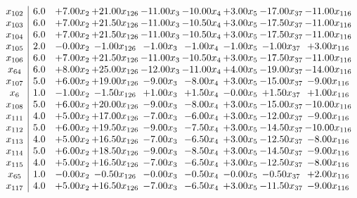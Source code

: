 \documentclass[8pt]{article}
\begin{document}
\[\begin{array}{c| c c@{\hskip 2pt} c@{\hskip 2pt} c@{\hskip 2pt} c@{\hskip 2pt} c@{\hskip 2pt} c@{\hskip 2pt} c@{\hskip 2pt} }
 x_{102}   &  6.0 & +  7.00 x_{2} & + 21.00 x_{126} & -11.00 x_{3} & -10.00 x_{4} & +  3.00 x_{5} & -17.00 x_{37} & -11.00 x_{116}\\
 x_{103}   &  6.0 & +  7.00 x_{2} & + 21.50 x_{126} & -11.00 x_{3} & -10.50 x_{4} & +  3.00 x_{5} & -17.50 x_{37} & -11.00 x_{116}\\
 x_{104}   &  6.0 & +  7.00 x_{2} & + 21.50 x_{126} & -11.00 x_{3} & -10.50 x_{4} & +  3.00 x_{5} & -17.50 x_{37} & -11.00 x_{116}\\
 x_{105}   &  2.0 & -0.00 x_{2} & -1.00 x_{126} & -1.00 x_{3} & -1.00 x_{4} & -1.00 x_{5} & -1.00 x_{37} & +  3.00 x_{116}\\
 x_{106}   &  6.0 & +  7.00 x_{2} & + 21.50 x_{126} & -11.00 x_{3} & -10.50 x_{4} & +  3.00 x_{5} & -17.50 x_{37} & -11.00 x_{116}\\
 x_{64}   &  6.0 & +  8.00 x_{2} & + 25.00 x_{126} & -12.00 x_{3} & -11.00 x_{4} & +  4.00 x_{5} & -19.00 x_{37} & -14.00 x_{116}\\
 x_{107}   &  5.0 & +  6.00 x_{2} & + 19.00 x_{126} & -9.00 x_{3} & -8.00 x_{4} & +  3.00 x_{5} & -15.00 x_{37} & -9.00 x_{116}\\
 x_{6}   &  1.0 & -1.00 x_{2} & -1.50 x_{126} & +  1.00 x_{3} & +  1.50 x_{4} & -0.00 x_{5} & +  1.50 x_{37} & +  1.00 x_{116}\\
 x_{108}   &  5.0 & +  6.00 x_{2} & + 20.00 x_{126} & -9.00 x_{3} & -8.00 x_{4} & +  3.00 x_{5} & -15.00 x_{37} & -10.00 x_{116}\\
 x_{111}   &  4.0 & +  5.00 x_{2} & + 17.00 x_{126} & -7.00 x_{3} & -6.00 x_{4} & +  3.00 x_{5} & -12.00 x_{37} & -9.00 x_{116}\\
 x_{112}   &  5.0 & +  6.00 x_{2} & + 19.50 x_{126} & -9.00 x_{3} & -7.50 x_{4} & +  3.00 x_{5} & -14.50 x_{37} & -10.00 x_{116}\\
 x_{113}   &  4.0 & +  5.00 x_{2} & + 16.50 x_{126} & -7.00 x_{3} & -6.50 x_{4} & +  3.00 x_{5} & -12.50 x_{37} & -8.00 x_{116}\\
 x_{114}   &  5.0 & +  6.00 x_{2} & + 18.50 x_{126} & -9.00 x_{3} & -8.50 x_{4} & +  3.00 x_{5} & -14.50 x_{37} & -9.00 x_{116}\\
 x_{115}   &  4.0 & +  5.00 x_{2} & + 16.50 x_{126} & -7.00 x_{3} & -6.50 x_{4} & +  3.00 x_{5} & -12.50 x_{37} & -8.00 x_{116}\\
 x_{65}   &  1.0 & -0.00 x_{2} & -0.50 x_{126} & -0.00 x_{3} & -0.50 x_{4} & -0.00 x_{5} & -0.50 x_{37} & +  2.00 x_{116}\\
 x_{117}   &  4.0 & +  5.00 x_{2} & + 16.50 x_{126} & -7.00 x_{3} & -6.50 x_{4} & +  3.00 x_{5} & -11.50 x_{37} & -9.00 x_{116}\\

\end{array}\]
\end{document}
